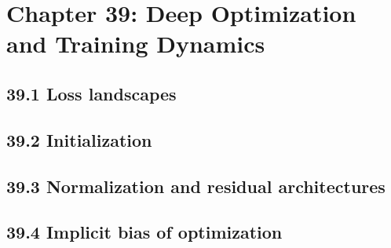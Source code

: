 \section{Chapter 39: Deep Optimization and Training Dynamics}

\subsection{39.1 Loss landscapes}

\subsection{39.2 Initialization}

\subsection{39.3 Normalization and residual architectures}

\subsection{39.4 Implicit bias of optimization}

\clearpage
